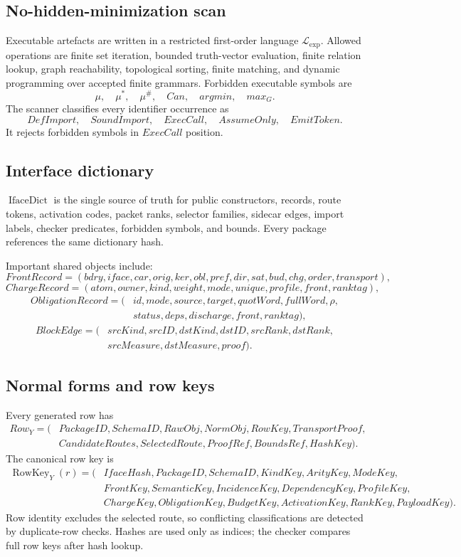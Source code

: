 \documentclass[10.5pt,a4paper]{article}
\newcommand{\IfaceDict}{\operatorname{IfaceDict}}
\newcommand{\RowKey}{\operatorname{RowKey}}
\begin{document}
\subsection{No-hidden-minimization scan}
Executable artefacts are written in a restricted first-order language \(\mathcal L_{\exp}\). Allowed operations are finite set iteration, bounded truth-vector evaluation, finite relation lookup, graph reachability, topological sorting, finite matching, and dynamic programming over accepted finite grammars. Forbidden executable symbols are
\[
\mu,
\quad \mu^*,
\quad \mu^\#,
\quad Can,
\quad argmin,
\quad max_G.
\]
The scanner classifies every identifier occurrence as
\[
DefImport,
\quad SoundImport,
\quad ExecCall,
\quad AssumeOnly,
\quad EmitToken.
\]
It rejects forbidden symbols in \(ExecCall\) position.

\subsection{Interface dictionary}
\(\IfaceDict\) is the single source of truth for public constructors, records, route tokens, activation codes, packet ranks, selector families, sidecar edges, import labels, checker predicates, forbidden symbols, and bounds. Every package references the same dictionary hash.

Important shared objects include:
\[
FrontRecord=(bdry,iface,car,orig,ker,obl,pref,dir,sat,bud,chg,order,transport),
\]
\[
ChargeRecord=(atom,owner,kind,weight,mode,unique,profile,front,ranktag),
\]
\[
\begin{aligned}
ObligationRecord=(&id,mode,source,target,quotWord,fullWord,\rho,\\
&status,deps,discharge,front,ranktag),
\end{aligned}
\]
\[
\begin{aligned}
BlockEdge=(&srcKind,srcID,dstKind,dstID,srcRank,dstRank,\\
&srcMeasure,dstMeasure,proof).
\end{aligned}
\]

\subsection{Normal forms and row keys}
Every generated row has
\[
\begin{aligned}
Row_Y=(&PackageID,SchemaID,RawObj,NormObj,RowKey,TransportProof,\\
&CandidateRoutes,SelectedRoute,ProofRef,BoundsRef,HashKey).
\end{aligned}
\]
The canonical row key is
\[
\begin{aligned}
\RowKey_Y(r)=(&IfaceHash,PackageID,SchemaID,KindKey,ArityKey,ModeKey,\\
&FrontKey,SemanticKey,IncidenceKey,DependencyKey,ProfileKey,\\
&ChargeKey,ObligationKey,BudgetKey,ActivationKey,RankKey,PayloadKey).
\end{aligned}
\]
Row identity excludes the selected route, so conflicting classifications are detected by duplicate-row checks. Hashes are used only as indices; the checker compares full row keys after hash lookup.
\end{document}
